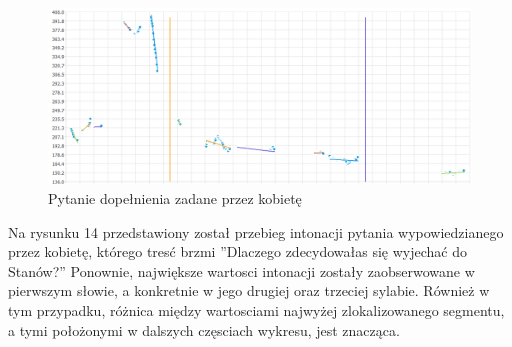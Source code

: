 \documentclass[a4paper,12 pt]{article}
\begin{document}
 \FloatBarrier
\begin{figure}[h]
\centering
\includegraphics[scale=0.7]{pytanie_dopelnienia_kobieta.png}
\caption{Pytanie dopełnienia zadane przez kobietę}
\end{figure}
\FloatBarrier
Na rysunku 14 przedstawiony został przebieg intonacji pytania wypowiedzianego przez kobietę, którego tresć brzmi ''Dlaczego zdecydowałas się wyjechać do Stanów?'' Ponownie, największe wartosci intonacji zostały zaobserwowane w pierwszym słowie, a konkretnie w jego drugiej oraz trzeciej sylabie. Również w tym przypadku, różnica między wartosciami najwyżej zlokalizowanego segmentu, a tymi położonymi w dalszych częsciach wykresu, jest znacząca.
\end{document}
